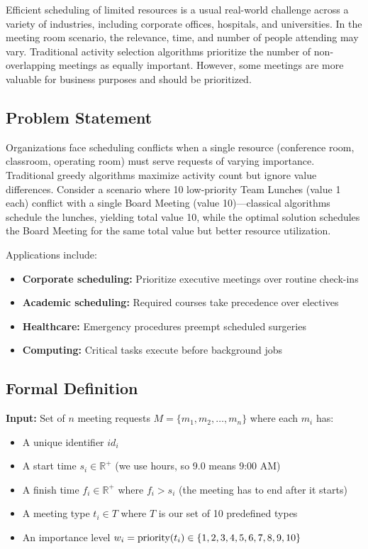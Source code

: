 \documentclass[conference]{IEEEtran}
\begin{document}
Efficient scheduling of limited resources is a usual real-world challenge across a variety of industries, including corporate offices, hospitals, and universities. In the meeting room scenario, the relevance, time, and number of people attending may vary. Traditional activity selection algorithms prioritize the number of non-overlapping meetings as equally important. However, some meetings are more valuable for business purposes and should be prioritized.

\subsection{Problem Statement}

Organizations face scheduling conflicts when a single resource (conference room, classroom, operating room) must serve requests of varying importance. Traditional greedy algorithms maximize activity count but ignore value differences. Consider a scenario where 10 low-priority Team Lunches (value 1 each) conflict with a single Board Meeting (value 10)—classical algorithms schedule the lunches, yielding total value 10, while the optimal solution schedules the Board Meeting for the same total value but better resource utilization.

Applications include:
\begin{itemize}
    \item \textbf{Corporate scheduling:} Prioritize executive meetings over routine check-ins
    \item \textbf{Academic scheduling:} Required courses take precedence over electives
    \item \textbf{Healthcare:} Emergency procedures preempt scheduled surgeries
    \item \textbf{Computing:} Critical tasks execute before background jobs
\end{itemize}

\subsection{Formal Definition}

\textbf{Input:} Set of $n$ meeting requests $M = \{m_1, m_2, \ldots, m_n\}$ where each $m_i$ has:
\begin{itemize}
    \item A unique identifier $id_i$
    \item A start time $s_i \in \mathbb{R}^+$ (we use hours, so 9.0 means 9:00 AM)
    \item A finish time $f_i \in \mathbb{R}^+$ where $f_i > s_i$ (the meeting has to end after it starts)
    \item A meeting type $t_i \in T$ where $T$ is our set of 10 predefined types
    \item An importance level $w_i = \text{priority}(t_i) \in \{1,2,3,4,5,6,\\7,8,9,10\}$
\end{itemize}
\end{document}
